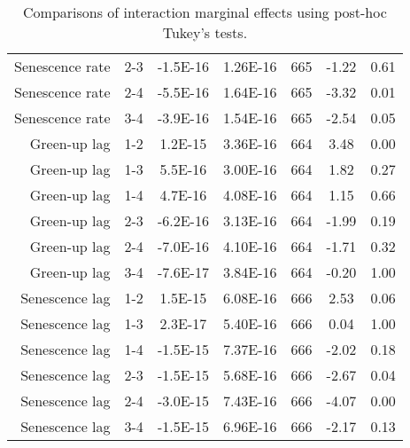 \begin{table}[H]
\begin{tabular}{rcccccc}
  Senescence rate & 2-3 & -1.5E-16 & 1.26E-16 & 665 & -1.22 & 0.61 \\ 
  Senescence rate & 2-4 & -5.5E-16 & 1.64E-16 & 665 & -3.32 & 0.01 \\ 
  Senescence rate & 3-4 & -3.9E-16 & 1.54E-16 & 665 & -2.54 & 0.05 \\ 
  Green-up lag & 1-2 & 1.2E-15 & 3.36E-16 & 664 & 3.48 & 0.00 \\ 
  Green-up lag & 1-3 & 5.5E-16 & 3.00E-16 & 664 & 1.82 & 0.27 \\ 
  Green-up lag & 1-4 & 4.7E-16 & 4.08E-16 & 664 & 1.15 & 0.66 \\ 
  Green-up lag & 2-3 & -6.2E-16 & 3.13E-16 & 664 & -1.99 & 0.19 \\ 
  Green-up lag & 2-4 & -7.0E-16 & 4.10E-16 & 664 & -1.71 & 0.32 \\ 
  Green-up lag & 3-4 & -7.6E-17 & 3.84E-16 & 664 & -0.20 & 1.00 \\ 
  Senescence lag & 1-2 & 1.5E-15 & 6.08E-16 & 666 & 2.53 & 0.06 \\ 
  Senescence lag & 1-3 & 2.3E-17 & 5.40E-16 & 666 & 0.04 & 1.00 \\ 
  Senescence lag & 1-4 & -1.5E-15 & 7.37E-16 & 666 & -2.02 & 0.18 \\ 
  Senescence lag & 2-3 & -1.5E-15 & 5.68E-16 & 666 & -2.67 & 0.04 \\ 
  Senescence lag & 2-4 & -3.0E-15 & 7.43E-16 & 666 & -4.07 & 0.00 \\ 
  Senescence lag & 3-4 & -1.5E-15 & 6.96E-16 & 666 & -2.17 & 0.13 \\ 
  \end{tabular}
\caption{Comparisons of interaction marginal effects using post-hoc Tukey's tests.} 
\label{lsq_terms}
\end{table}

